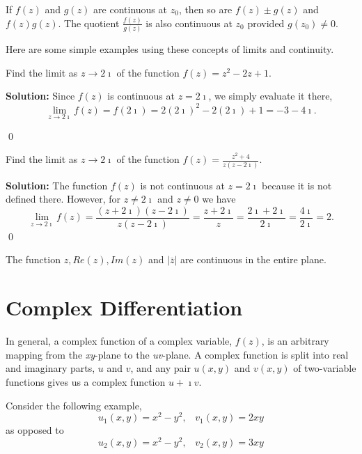 \begin{theorem}
If $f(z)$ and $g(z)$ are continuous at $z_0$, then so are $f(z) \pm g(z)$ and $f(z)g(z)$.  The quotient $\frac{f(z)}{g(z)}$ is also continuous at $z_0$ provided $g(z_0) \neq 0$.
\end{theorem}

Here are some simple examples using these concepts of limits and continuity.

\begin{example}
Find the limit as $z \rightarrow 2 \imath$ of the function $f(z)=z^2-2z+1$.
\end{example}

\textbf{Solution: } Since $f(z)$ is continuous at $z=2 \imath$, we simply evaluate it there, 
$$\lim_{z \to 2\imath} f(z)=f(2\imath)=2(2\imath)^2-2(2\imath)+1=-3-4\imath.$$

\qed
\begin{example}
Find the limit as $z \rightarrow 2 \imath$ of the function $f(z) = \frac{z^2 + 4}{z(z-2\imath)}$.
\end{example}

\textbf{Solution: } The function $f(z)$ is not continuous at $z=2\imath$ because it is not defined there.  However, for $z \neq 2\imath$ and $z \neq 0$ we have $$\lim_{z \to 2\imath} f(z) = \frac{(z+2\imath)(z-2\imath)}{z(z-2\imath)}=\frac{z+2\imath}{z}=\frac{2\imath+2\imath}{2\imath}=\frac{4\imath}{2\imath}=2.$$
\qed


\begin{example}
The function $z, Re(z), Im(z)$ and $|\overline{z}|$ are continuous in the entire plane.
\end{example}
\section{Complex Differentiation}
In general, a complex function of a complex variable, $f(z)$, is an arbitrary mapping from the \textit{xy}-plane to the \textit{uv}-plane.  A complex function is split into real and imaginary parts, $u$ and $v$, and any pair $u(x,y)$ and $v(x,y)$ of two-variable functions gives us a complex function $u+\imath v$.  

Consider the following  example, 
\[u_1(x,y)=x^2-y^2, \,\,\,\,\,v_1(x,y)=2xy\]
as opposed to
\[u_2(x,y)=x^2-y^2, \,\,\,\,\, v_2(x,y)=3xy\]

